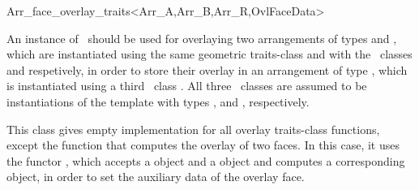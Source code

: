 
\ccRefPageBegin

\begin{ccRefClass}{Arr_face_overlay_traits<Arr_A,Arr_B,Arr_R,OvlFaceData>}

\ccDefinition

An instance of \ccRefName\ should be used for overlaying two arrangements
of types  and , which are instantiated using the same
geometric traits-class and with the \dcel\ classes  and
 respetively, in order to store their overlay in an arrangement
of type , which is instantiated using a third \dcel\ class
. All three \dcel\ classes are assumed to be instantiations of the
 template with types ,
 and , respectively.

This class gives empty implementation for all overlay traits-class functions,
except the function that computes the overlay of two faces. In this case,
it uses the functor , which accepts a  object
and a  object and computes a corresponding 
object, in order to set the auxiliary data of the overlay face.


\ccIsModel

\ccSeeAlso
     \\
     \\

\end{ccRefClass}

\ccRefPageEnd
